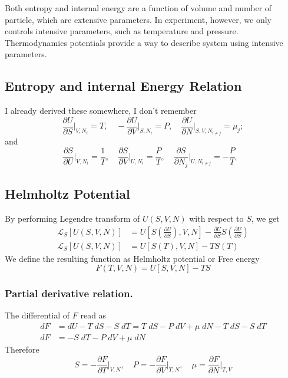 \documentclass[../../../Main.tex]{subfiles}
\begin{document}
Both entropy and internal energy are a function of volume and number of particle, which are extensive parameters. In experiment, however, we only controls intensive parameters, such as temperature and pressure. Thermodynamics potentials provide a way to describe system using intensive parameters.

\subsection*{Entropy and internal Energy Relation}
I already derived these somewhere, I don't remember
\begin{equation*}
    \frac{\partial U}{\partial S}\bigg|_{V, N_{i} }=T,\quad
    -\frac{\partial U}{\partial V}\bigg|_{S, N_{i} }=P,\quad
    \frac{\partial U}{\partial N}\bigg|_{S, V, N_{i\neq j} }=\mu_j;
\end{equation*}
and 
\begin{equation*}
    \frac{\partial S}{\partial U}\bigg|_{V, N_i}=\frac{1}{T},\quad
    \frac{\partial S}{\partial V}\bigg|_{U, N_i}=\frac{P}{T},\quad
    \frac{\partial S}{\partial N_j}\bigg|_{U, N_{i\neq j}}=-\frac{P}{T}\quad
\end{equation*}

\subsection*{Helmholtz Potential}
By performing Legendre transform of $U(S,V,N)$ with respect to $S$, we get
\begin{align*}
    \mathcal{L}_S[U(S,V,N)]&=U\left[S\left(\frac{\partial U}{\partial S}\right), V,N\right]-\frac{\partial U}{\partial S}S\left(\frac{\partial U}{\partial S}\right)\\
    \mathcal{L}_S[U(S,V,N)]&=U[S(T),V,N]-TS(T)
\end{align*}
We define the resulting function as Helmholtz potential or Free energy
\begin{equation*}
    F(T,V,N)=U[S,V,N]-TS
\end{equation*}

\subsubsection*{Partial derivative relation.} The differential of $F$ read as
\begin{align*}
    dF&=dU-T\;dS-S\;dT=T\;dS-P\;dV+\mu \;dN-T\;dS-S\;dT\\
    dF&=-S\;dT - P\; dV + \mu \;dN
\end{align*}
Therefore
\begin{equation*}
    S=-\frac{\partial F}{\partial T}\bigg|_{V,N},\quad P=-\frac{\partial F}{\partial V}\bigg|_{T,N},\quad \mu=\frac{\partial F}{\partial N}\bigg|_{T,V}
\end{equation*}
\end{document}
